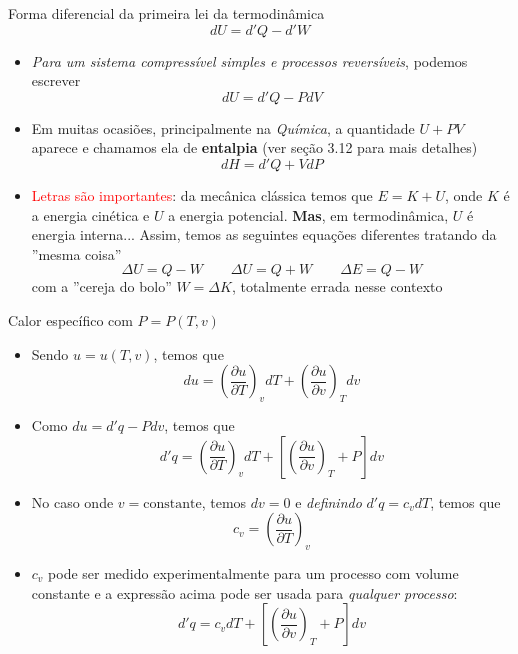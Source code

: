 \documentclass[t,%
brazilian,%
11pt,%
aspectratio=169,%
table%
]{beamer}
\begin{document}
\begin{frame}{Forma diferencial da primeira lei da termodinâmica}
    \[
        \boxed{dU = d'Q - d'W}
    \]
\begin{itemize}
    \item \textit{Para um sistema compressível simples e processos reversíveis}, podemos escrever
        \[
            dU=d'Q-PdV
        \]
    \item Em muitas ocasiões, principalmente na \textit{Química}, a quantidade
        \(U+PV\) aparece e chamamos ela de \textbf{entalpia} (ver seção 3.12 para mais detalhes)
        \[
            dH = d'Q+VdP
        \]
    \item \textcolor{red}{Letras são importantes}: da mecânica clássica temos que \(E=K+U\), onde \(K\)
        é a energia cinética e \(U\) a energia potencial. \textbf{Mas}, em termodinâmica, \(U\) é
        energia interna... Assim, temos as seguintes equações diferentes tratando da ''mesma coisa''
        \[
            \Delta U = Q-W \qquad \Delta U = Q+W \qquad \Delta E = Q - W
        \]
        com a ''cereja do bolo'' \(W=\Delta K\), totalmente errada nesse contexto
\end{itemize}
\end{frame}

\newcommand{\diff}[2]{\left(\frac{\partial #1}{\partial #2}\right)}
\begin{frame}{Calor específico com \(P=P(T,v)\)}
    \begin{itemize}
        \item Sendo \(u=u(T,v)\), temos que
            \[
                du = \diff{u}{T}_v dT + \diff{u}{v}_T dv
            \]
        \item Como \(du = d'q-Pdv\), temos que
            \[
                d'q=\diff{u}{T}_v dT + \left[ \diff{u}{v}_T + P\right] dv
            \]
        \item No caso onde \(v=\text{constante}\), temos \(dv=0\) e \textit{definindo} 
            \(d'q = c_v dT\), temos que
            \[
                c_v = \diff{u}{T}_v
            \]
        \item \(c_v\) pode ser medido experimentalmente para um processo com
            volume constante e a expressão acima pode ser usada para \textit{qualquer processo}:
            \[
                d'q=c_v dT+ \left[ \diff{u}{v}_T + P\right] dv
            \]
    \end{itemize}
\end{frame}
\end{document}
